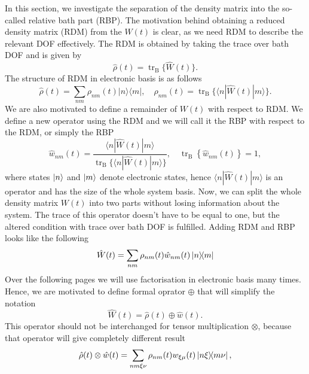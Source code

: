 In this section, we investigate the separation of the density matrix into the so-called relative bath part (RBP). The motivation behind obtaining a reduced density matrix (RDM) from the $W(t)$ is clear, as we need RDM to describe the relevant DOF effectively. The RDM is obtained by taking the trace over bath DOF and is given by
\begin{equation}
    \hat{\rho}(t)=\operatorname{tr}_{\mathrm{B}}\{\hat{W}(t)\}.
\end{equation}
The structure of RDM in electronic basis is as follows
\begin{equation}
    \hat{\rho}(t)=\sum_{n m} \rho_{n m}(t)|n\rangle\langle m|, \quad \rho_{n m}(t)=\operatorname{tr}_{\mathrm{B}}\{\langle n|\hat{W}(t)|m\rangle\}.
\end{equation}
We are also motivated to define a remainder of $W(t)$ with respect to RDM. We define a new operator using the RDM and we will call it the RBP with respect to the RDM, or simply the RBP
\begin{equation}
    \hat{w}_{n m}(t)=\frac{\langle n|\hat{W}(t)| m\rangle}{\operatorname{tr}_{\mathrm{B}}\{\langle n|\hat{W}(t)| m\rangle\}}, \quad \operatorname{tr}_{\mathrm{B}}\left\{\hat{w}_{n m}(t)\right\}=1,
\end{equation}
where states $\ket{n}$ and $\ket{m}$ denote electronic states, hence $\langle n|\hat{W}(t)| m\rangle$ is an operator and has the size of the whole system basis. Now, we can split the whole density matrix $W(t)$ into two parts without losing information about the system. The trace of this operator doesn't have to be equal to one, but the altered condition with trace over bath DOF is fulfilled. Adding RDM and RBP looks like the following
\begin{equation}
    \hat{W}(t)=\sum_{n m} \rho_{n m}(t) \hat{w}_{n m}(t)\ketbra{n}{m} 
\end{equation}
Over the following pages we will use factorisation in electronic basis many times. Hence, we are motivated to define formal oprator $\oplus$ that will simplify the notation 
\begin{equation}
    \hat{W}(t)= \hat{\rho}(t) \oplus \hat{w}(t).
\end{equation}
This operator should not be interchanged for tensor multiplication $\otimes$, because that operator will give completely different result
\begin{equation}
    \hat{\rho}(t) \otimes \hat{w}(t) = \sum_{n m \xi \nu} \rho_{n m}(t) w_{\xi \mu}(t)\ketbra{n \xi}{m \nu},
\end{equation}
